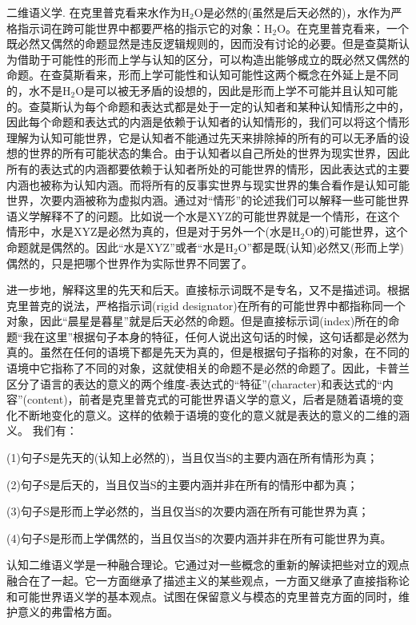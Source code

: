 \documentclass{article}
\begin{document}
{{\heiti 二维语义学.}
在克里普克看来水作为$\mathrm{H_2O}$是必然的(虽然是后天必然的)，水作为严格指示词在跨可能世界中都要严格的指示它的对象：$\mathrm{H_2O}$。在克里普克看来，一个既必然又偶然的命题显然是违反逻辑规则的，因而没有讨论的必要。但是查莫斯认为借助于可能性的形而上学与认知的区分，可以构造出能够成立的既必然又偶然的命题。在查莫斯看来，形而上学可能性和认知可能性这两个概念在外延上是不同的，水不是$\mathrm{H_2O}$是可以被无矛盾的设想的，因此是形而上学不可能并且认知可能的。查莫斯认为每个命题和表达式都是处于一定的认知者和某种认知情形之中的，因此每个命题和表达式的内涵是依赖于认知者的认知情形的，我们可以将这个情形理解为认知可能世界，它是认知者不能通过先天来排除掉的所有的可以无矛盾的设想的世界的所有可能状态的集合。由于认知者以自己所处的世界为现实世界，因此所有的表达式的内涵都要依赖于认知者所处的可能世界的情形，因此表达式的主要内涵也被称为认知内涵。而将所有的反事实世界与现实世界的集合看作是认知可能世界，次要内涵被称为虚拟内涵。通过对“情形”的论述我们可以解释一些可能世界语义学解释不了的问题。比如说一个水是XYZ的可能世界就是一个情形，在这个情形中，水是XYZ是必然为真的，但是对于另外一个(水是$\mathrm{H_2O}$的)可能世界，这个命题就是偶然的。因此“水是XYZ”或者“水是$\mathrm{H_2O}$”都是既(认知)必然又(形而上学)偶然的，只是把哪个世界作为实际世界不同罢了。

进一步地，解释这里的先天和后天。直接标示词既不是专名，又不是描述词。根据克里普克的说法，严格指示词(rigid designator)在所有的可能世界中都指称同一个对象，因此“晨星是暮星”就是后天必然的命题。但是直接标示词(index)所在的命题“我在这里”根据句子本身的特征，任何人说出这句话的时候，这句话都是必然为真的。虽然在任何的语境下都是先天为真的，但是根据句子指称的对象，在不同的语境中它指称了不同的对象，这就使相关的命题不是必然的命题了。因此，卡普兰区分了语言的表达的意义的两个维度-表达式的“特征”(character)和表达式的“内容”(content)，前者是克里普克式的可能世界语义学的意义，后者是随着语境的变化不断地变化的意义。这样的依赖于语境的变化的意义就是表达的意义的二维的涵义。
我们有：

(1)句子S是先天的(认知上必然的)，当且仅当S的主要内涵在所有情形为真；

(2)句子S是后天的，当且仅当S的主要内涵并非在所有的情形中都为真；

(3)句子S是形而上学必然的，当且仅当S的次要内涵在所有可能世界为真；

(4)句子S是形而上学偶然的，当且仅当S的次要内涵并非在所有可能世界为真。

认知二维语义学是一种融合理论。它通过对一些概念的重新的解读把些对立的观点融合在了一起。它一方面继承了描述主义的某些观点，一方面又继承了直接指称论和可能世界语义学的基本观点。试图在保留意义与模态的克里普克方面的同时，维护意义的弗雷格方面。
}
\end{document}
